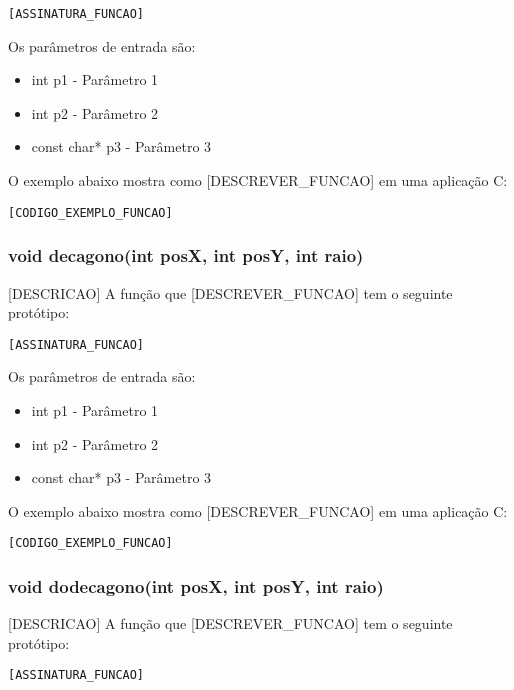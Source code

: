 \documentclass[12pt, %
openright,
oneside, %
a4paper,    %
brazil]{facom-ufu-abntex2}
\begin{document}
\begin{lstlisting}
[ASSINATURA_FUNCAO]
\end{lstlisting}

Os parâmetros de entrada são:

\begin{itemize}
    \item int p1 - Parâmetro 1
    \item int p2 - Parâmetro 2
    \item const char* p3 - Parâmetro 3
\end{itemize}

O exemplo abaixo mostra como [DESCREVER_FUNCAO] em uma aplicação C:

\begin{lstlisting}
[CODIGO_EXEMPLO_FUNCAO]
\end{lstlisting}

\subsubsection{void decagono(int posX, int posY, int raio)}
[DESCRICAO]
A função que [DESCREVER_FUNCAO] tem o seguinte protótipo:

\begin{lstlisting}
[ASSINATURA_FUNCAO]
\end{lstlisting}

Os parâmetros de entrada são:

\begin{itemize}
    \item int p1 - Parâmetro 1
    \item int p2 - Parâmetro 2
    \item const char* p3 - Parâmetro 3
\end{itemize}

O exemplo abaixo mostra como [DESCREVER_FUNCAO] em uma aplicação C:

\begin{lstlisting}
[CODIGO_EXEMPLO_FUNCAO]
\end{lstlisting}

\subsubsection{void dodecagono(int posX, int posY, int raio)}
[DESCRICAO]
A função que [DESCREVER_FUNCAO] tem o seguinte protótipo:

\begin{lstlisting}
[ASSINATURA_FUNCAO]
\end{lstlisting}
\end{document}
